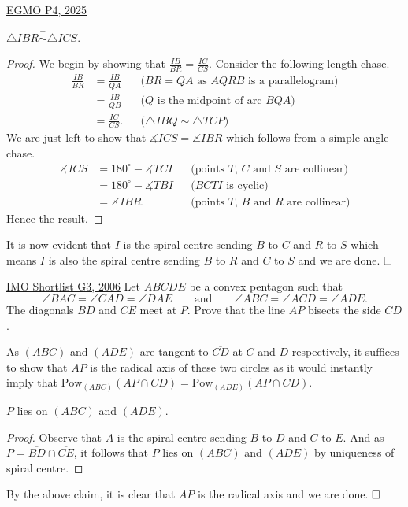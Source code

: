 \begin{problem}{7}{\href{https://artofproblemsolving.com/community/q2h3548106p35507758}{EGMO P4, 2025}}
\begin{solution}
	\begin{numclaim}{2}
		$\triangle IBR\overset{+}{\sim}\triangle ICS$.
	\end{numclaim}
	\begin{proof} We begin by showing that $\frac{IB}{BR}=\frac{IC}{CS}$. Consider the following length chase.
\begin{align*} \frac{IB}{BR}&=\frac{IB}{QA} && \text{($BR=QA$ as $AQRB$ is a parallelogram)}\\ &=\frac{IB}{QB} && \text{($Q$ is the midpoint of arc $BQA$)}\\ &=\frac{IC}{CS}.&& \text{($\triangle IBQ\sim \triangle TCP$)} \end{align*}We are just left to show that $\measuredangle ICS=\measuredangle IBR$ which follows from a simple angle chase.
\begin{align*} \measuredangle ICS&=180^{\circ}-\measuredangle TCI &&\text{(points $T$, $C$ and $S$ are collinear)}\\ &=180^{\circ}-\measuredangle TBI && \text{($BCTI$ is cyclic)}\\ &=\measuredangle IBR. && \text{(points $T$, $B$ and $R$ are collinear)} \end{align*}Hence the result.
	\end{proof}

	It is now evident that $I$ is the spiral centre sending $B$ to $C$ and $R$ to $S$ which means $I$ is also the spiral centre sending $B$ to $R$ and $C$ to $S$ and we are done. $\qedwhite$
	\end{solution}
\end{problem}

\begin{problem}{8}{\href{https://artofproblemsolving.com/community/q2h130813p35493023}{IMO Shortlist G3, 2006}} 
	Let $ ABCDE$ be a convex pentagon such that
\[ \angle BAC = \angle CAD = \angle DAE\qquad \text{and}\qquad \angle ABC = \angle ACD = \angle ADE. \]The diagonals $BD$ and $CE$ meet at $P$. Prove that the line $AP$ bisects the side $CD$.
	\begin{solution} As $(ABC)$ and $(ADE)$ are tangent to $\overline{CD}$ at $C$ and $D$ respectively, it suffices to show that $AP$ is the radical axis of these two circles as it would instantly imply that $\text{Pow}_{(ABC)}(AP\cap CD)=\text{Pow}_{(ADE)}(AP\cap CD)$.

	\begin{numclaim}{1} $P$ lies on $(ABC)$ and $(ADE)$.
	\end{numclaim}
	\begin{proof} Observe that $A$ is the spiral centre sending $B$ to $D$ and $C$ to $E$. And as $P=\overline{BD}\cap \overline{CE}$, it follows that $P$ lies on $(ABC)$ and $(ADE)$ by uniqueness of spiral centre.
	\end{proof}

	By the above claim, it is clear that $AP$ is the radical axis and we are done. $\qedwhite$
	\end{solution}
\end{problem}

